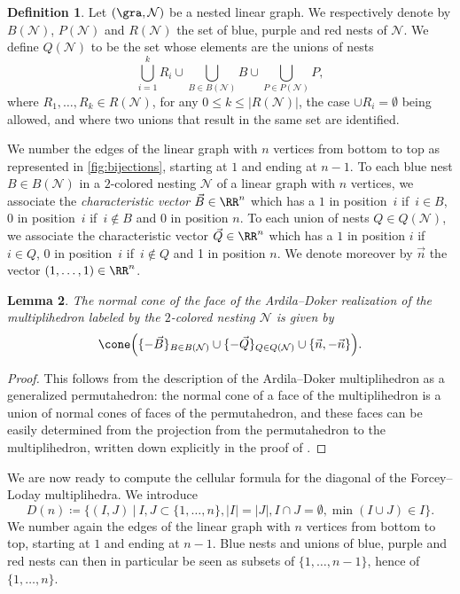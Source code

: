 \documentclass[JEP,XML,SOM,NoFloatCountersInSection,Unicode,published]{cedram}
\theoremstyle{definition}
\newtheorem{definition}{Definition}[section]
\theoremstyle{plain}
\newtheorem{lemma}[definition]{Lemma}
\begin{document}
 \label{ss:cellular-formula}

\begin{definition}
Let $(\gra,\mathcal{N})$ be a nested linear graph.
We respectively denote by $B(\mathcal{N})$, $P(\mathcal{N})$ and $R(\mathcal{N})$ the set of blue, purple and red nests of $\mathcal{N}$.
We define $Q(\mathcal{N})$ to be the set whose elements are the unions of nests
\[
\bigcup_{i=1}^k R_i \cup \bigcup_{B \in B(\mathcal{N})} B \cup
\bigcup_{P \in P(\mathcal{N})} P,
\]
where $R_1,\ldots,R_k \in R(\mathcal{N})$, for any $0 \leq k \leq |R(\mathcal{N})|$, the case $\cup R_i = \emptyset$ being allowed, and where two unions that result in the same set are identified.
\end{definition}

We number the edges of the linear graph with $n$ vertices from bottom to top as represented in \cref{fig:bijections}, starting at $1$ and ending at $n-1$.
To each blue nest $B \in B(\mathcal{N})$ in a $2$-colored nesting $\mathcal{N}$ of a linear graph with $n$ vertices, we associate the \emph{characteristic vector} $\vec B\in \RR^n$ which has a $1$ in position~$i$ if~$i \in B$, $0$ in position~$i$ if~$i \notin B$ and $0$ in position $n$.
To each union of nests $Q \in Q(\mathcal{N})$, we associate the characteristic vector $\vec Q \in \RR^n$ which has a $1$ in position $i$ if $i \in Q$, $0$ in position~$i$ if~$i \notin Q$ and 1 in position $n$.
We denote moreover by $\vec n$ the vector $(1,\ldots,1) \in \RR^n$.

\begin{lemma}
\label{lemma:normalcones}
The normal cone of the face of the Ardila--Doker realization of the multiplihedron labeled by the $2$-colored nesting $\mathcal{N}$ is given by
\[
\cone\Bigl(\{-\vec B\}_{B \in B(\mathcal{N})} \cup \{-\vec Q\}_{Q \in Q(\mathcal{N})} \cup \{\vec n, - \vec n\} \Bigr).
\]
\end{lemma}

\begin{proof}
This follows from the description of the Ardila--Doker multiplihedron as a generalized permutahedron:
the normal cone of a face of the multiplihedron is a union of normal cones of faces of the permutahedron, and these faces can be easily determined from the projection from the permutahedron to the multiplihedron, written down explicitly in the proof of \cite[Th.\,3.3.6]{Doker11}.
\end{proof}

We are now ready to compute the cellular formula for the diagonal of the Forcey--Loday multiplihedra. We introduce
\[
D(n)\coloneqq \{(I,J) \ | \ I,J\subset\{1,\ldots,n\}, |I|=|J|, I\cap J=\emptyset, \min(I\cup J)\in I \}.
\]
We number again the edges of the linear graph with $n$ vertices from bottom to top, starting at $1$ and ending at $n-1$.
Blue nests and unions of blue, purple and red nests can then in particular be seen as subsets of $\{1,\ldots,n-1\}$, hence of $\{1,\ldots,n\}$.
\end{document}
